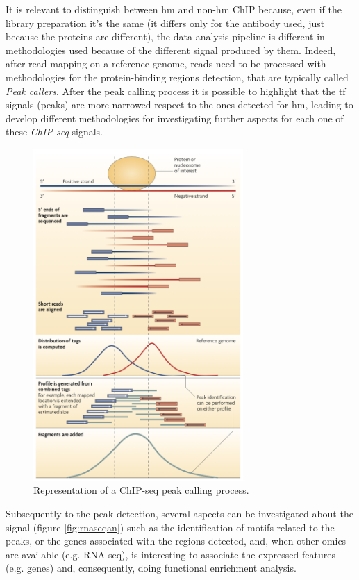 It is relevant to distinguish between \gls{hm} and non-\gls{hm} ChIP because, even if the library preparation it's the same (it differs only for the antibody used, just because the proteins are different), the data analysis pipeline is different in methodologies used because of the different signal produced by them.
Indeed, after read mapping on a reference genome, reads need to be processed with methodologies for the protein-binding regions detection, that are typically called \textit{Peak callers}.
After the peak calling process it is possible to highlight that the \gls{tf} signals (peaks) are more narrowed respect to the ones detected for \gls{hm}, leading to develop different methodologies for investigating further aspects for each one of these \textit{ChIP-seq} signals.

\begin{figure}[H]
\centering
\includegraphics[width=8cm, keepaspectratio]{img/intro/peak_call.png}
\caption[ChIP-seq peak detection]{Representation of a  ChIP-seq peak calling process. \cite{Park2009}}
\label{fig:chipseqexp}
\end{figure}

Subsequently to the peak detection, several aspects can be investigated about the signal (figure \ref{fig:rnaseqan}) such as the identification of motifs related to the peaks, or the genes associated with the regions detected, and, when other omics are available (e.g. RNA-seq), is interesting to associate the expressed features (e.g. genes) and, consequently,  doing functional enrichment analysis. 